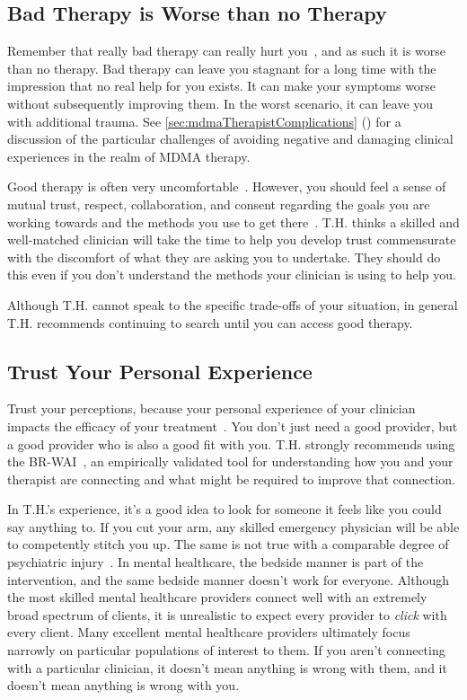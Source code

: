 \documentclass[11pt,oneside]{book}
\let\cite\parencite
\newcommand{\combinedcref}[1]{\cref{#1} (\nameref*{#1})} %
\begin{document}
\subsection*{Bad Therapy is Worse than no Therapy}
Remember that really bad therapy can really hurt you~\cite{hook2018boundary}, and as such it is worse than no therapy. Bad therapy can leave you stagnant for a long time with the impression that no real help for you exists. It can make your symptoms worse without subsequently improving them. In the worst scenario, it can leave you with additional trauma. See \combinedcref{sec:mdmaTherapistComplications} for a discussion of the particular challenges of avoiding negative and damaging clinical experiences in the realm of MDMA therapy.

Good therapy is often very uncomfortable~\cite{eckerUnlocking}. However, you should feel a sense of mutual trust, respect, collaboration, and consent regarding the goals you are working towards and the methods you use to get there~\cite{BRWAIdownload}. T.H. thinks a skilled and well-matched clinician will take the time to help you develop trust commensurate with the discomfort of what they are asking you to undertake. They should do this even if you don't understand the methods your clinician is using to help you.

Although T.H. cannot speak to the specific trade-offs of your situation, in general T.H. recommends continuing to search until you can access good therapy.

\subsection*{Trust Your Personal Experience}
Trust your perceptions, because your personal experience of your clinician impacts the efficacy of your treatment~\cite{horvath2011alliance}. You don't just need a good provider, but a good provider who is also a good fit with you. T.H. strongly recommends using the BR-WAI~\cite{BRWAIdownload}, an empirically validated tool for understanding how you and your therapist are connecting and what might be required to improve that connection.

In T.H.'s experience, it's a good idea to look for someone it feels like you could say anything to. If you cut your arm, any skilled emergency physician will be able to competently stitch you up. The same is not true with a comparable degree of psychiatric injury~\cite{firth2019therapistEffects}. In mental healthcare, the bedside manner is part of the intervention, and the same bedside manner doesn't work for everyone. Although the most skilled mental healthcare providers connect well with an extremely broad spectrum of clients, it is unrealistic to expect every provider to \textit{click} with every client. Many excellent mental healthcare providers ultimately focus narrowly on particular populations of interest to them. If you aren't connecting with a particular clinician, it doesn't mean anything is wrong with them, and it doesn't mean anything is wrong with you.
\end{document}
